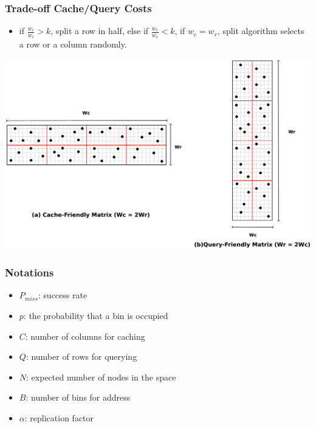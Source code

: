 \documentclass[red]{beamer}
\begin{document}
\begin{frame}
\frametitle{Trade-off Cache/Query Costs}
\begin{itemize}
\item if $\frac{w_r}{w_c} > k$, split a row in half, else if $\frac{w_r}{w_c} < k$, if $w_c=w_r$, split algorithm selects a row or a column randomly.
\end{itemize}
\begin{center}
\includegraphics[scale=0.12]{figs/asym_both.eps}
\end{center}
\end{frame}

\begin{frame}
\frametitle{Notations}
\begin{itemize}
\item $P_{miss}$: success rate
\item $p$: the probability that a bin is occupied
\item $C$: number of columns for caching
\item $Q$: number of rows for querying
\item $N$: expected number of nodes in the space
\item $B$: number of bins for address
\item $\alpha$: replication factor
\end{itemize}
\end{frame}
\end{document}
